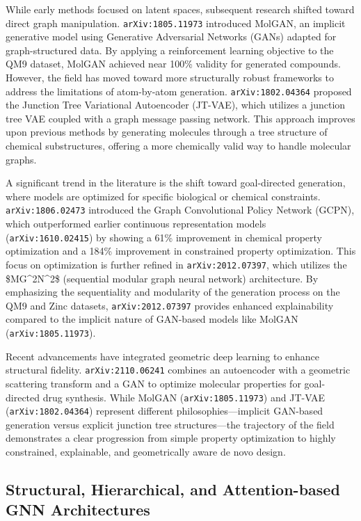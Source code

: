 \documentclass[11pt]{article}
\begin{document}
While early methods focused on latent spaces, subsequent research shifted toward direct graph manipulation. \texttt{arXiv:1805.11973} introduced MolGAN, an implicit generative model using Generative Adversarial Networks (GANs) adapted for graph-structured data. By applying a reinforcement learning objective to the QM9 dataset, MolGAN achieved near 100\% validity for generated compounds. However, the field has moved toward more structurally robust frameworks to address the limitations of atom-by-atom generation. \texttt{arXiv:1802.04364} proposed the Junction Tree Variational Autoencoder (JT-VAE), which utilizes a junction tree VAE coupled with a graph message passing network. This approach improves upon previous methods by generating molecules through a tree structure of chemical substructures, offering a more chemically valid way to handle molecular graphs.

A significant trend in the literature is the shift toward goal-directed generation, where models are optimized for specific biological or chemical constraints. \texttt{arXiv:1806.02473} introduced the Graph Convolutional Policy Network (GCPN), which outperformed earlier continuous representation models (\texttt{arXiv:1610.02415}) by showing a 61\% improvement in chemical property optimization and a 184\% improvement in constrained property optimization. This focus on optimization is further refined in \texttt{arXiv:2012.07397}, which utilizes the \$MG\textasciicircum{}2N\textasciicircum{}2\$ (sequential modular graph neural network) architecture. By emphasizing the sequentiality and modularity of the generation process on the QM9 and Zinc datasets, \texttt{arXiv:2012.07397} provides enhanced explainability compared to the implicit nature of GAN-based models like MolGAN (\texttt{arXiv:1805.11973}).

Recent advancements have integrated geometric deep learning to enhance structural fidelity. \texttt{arXiv:2110.06241} combines an autoencoder with a geometric scattering transform and a GAN to optimize molecular properties for goal-directed drug synthesis. While MolGAN (\texttt{arXiv:1805.11973}) and JT-VAE (\texttt{arXiv:1802.04364}) represent different philosophies—implicit GAN-based generation versus explicit junction tree structures—the trajectory of the field demonstrates a clear progression from simple property optimization to highly constrained, explainable, and geometrically aware de novo design.

\subsection{Structural, Hierarchical, and Attention-based GNN Architectures}
\end{document}
